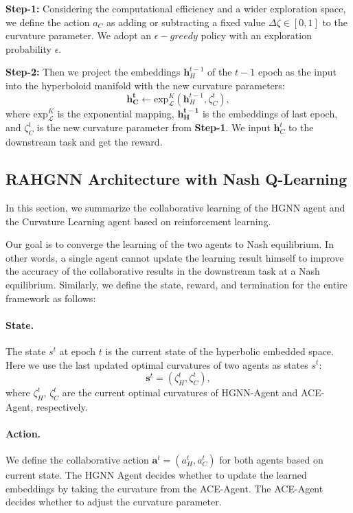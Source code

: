 \textbf{Step-1: }Considering the computational efficiency and a wider exploration space, we define the action $a_{C}$ as adding or subtracting a fixed value $\Delta\zeta \in [0,1]$ to the curvature parameter. 
We adopt an $\epsilon-greedy$ policy with an exploration probability $\epsilon$. 

\textbf{Step-2: }Then we project the embeddings $\mathbf{h}^{t-1}_{H}$ of the $t-1$ epoch as the input into the hyperboloid manifold with the new curvature parameters:
\begin{equation}
    \boldsymbol{\mathbf{h}^t_{C}} \gets \mathrm{exp}^{K}_{\mathcal{L}}(\mathbf{h}^{t-1}_{H}, \zeta^{t}_{C}), 
\end{equation}
where $\mathrm{exp}^{K}_{\mathcal{L}}$ is the exponential mapping, $\boldsymbol{\mathbf{h}^{t-1}_{H}}$ is the embeddings of last epoch, and $\zeta^{t}_{C}$ is the new curvature parameter from \textbf{Step-1}. 
We input $\mathbf{h}^t_{C}$ to the downstream task and get the reward. 

\subsection{RAHGNN Architecture with Nash Q-Learning}
In this section, we summarize the collaborative learning of the HGNN agent and the Curvature Learning agent based on reinforcement learning.

Our goal is to converge the learning of the two agents to Nash equilibrium. 
In other words, a single agent cannot update the learning result himself to improve the accuracy of the collaborative results in the downstream task at a Nash equilibrium.
Similarly, we define the state, reward, and termination for the entire framework as follows: 
\paragraph{State.} 
The state $s^t$ at epoch $t$ is the current state of the hyperbolic embedded space. 
Here we use the last updated optimal curvatures of two agents as states $s^t$:
\begin{equation}
    \mathbf{s}^t = (\zeta^t_{H}, \zeta^t_{C}),
\end{equation}
where $\zeta^t_{H}$, $\zeta^t_{C}$ are the current optimal curvatures of HGNN-Agent and ACE-Agent, respectively.  

\paragraph{Action.} 
We define the collaborative action $\mathbf{a}^t = (a^t_{H}, a^t_{C})$ for both agents based on current state. 
The HGNN Agent decides whether to update the learned embeddings by taking the curvature from the ACE-Agent. 
The ACE-Agent decides whether to adjust the curvature parameter.

